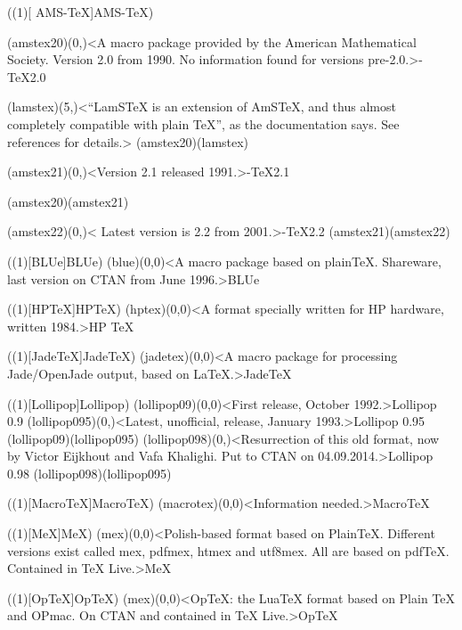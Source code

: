 \clearpage
\tograph(\tostruct(1)[\texorpdfstring{
AMS}{AMS}-\TeX]{AMS-\TeX}){
	\tonode(amstex20)(0,\layer)<A macro package provided by the American Mathematical Society. Version 2.0 from 1990. No information found for versions pre-2.0.>{\AMS-\TeX  2.0}
	\steplayer[-1]

	\tonode(lamstex)(5,\layer)<“LamSTeX{} is an extension of AmSTeX, and thus almost completely compatible with plain TeX”, as the documentation says. See references for details.>{}
	\todraw(amstex20)(lamstex)
	\steplayer[-1]

	\tonode(amstex21)(0,\layer)<Version 2.1 released 1991.>{\AMS-\TeX  2.1}

	\todraw(amstex20)(amstex21)
	\steplayer[-2]

	\tonode(amstex22)(0,\layer)< Latest version is 2.2 from 2001.>{\AMS-\TeX 2.2}
	\todraw(amstex21)(amstex22)
}

\tograph(\tostruct(1)[BLUe]{BLUe}){
	\tonode(blue)(0,0)<A macro package based on plainTeX. Shareware, last version on CTAN from June 1996.>{BLUe}
}

\tograph(\tostruct(1)[HP\TeX]{HP\TeX}){
	\tonode(hptex)(0,0)<A format specially written for HP hardware, written 1984.>{HP \TeX}
}

\tograph(\tostruct(1)[Jade\TeX]{Jade\TeX}){
	\tonode(jadetex)(0,0)<A macro package for processing Jade/OpenJade output, based on LaTeX.>{Jade\TeX}
}

\tograph(\tostruct(1)[Lollipop]{Lollipop}){
	\tonode(lollipop09)(0,0)<First release, October 1992.>{Lollipop 0.9}
	\steplayer[-2]
	\tonode(lollipop095)(0,\layer)<Latest, unofficial, release, January 1993.>{Lollipop 0.95}
	\todraw(lollipop09)(lollipop095)
	\steplayer[-2]
	\tonode(lollipop098)(0,\layer)<Resurrection of this old format, now by Victor Eijkhout and Vafa Khalighi. Put to CTAN on 04.09.2014.>{Lollipop 0.98}
	\todraw(lollipop098)(lollipop095)
}

\tograph(\tostruct(1)[Macro\TeX]{Macro\TeX}){
	\tonode(macrotex)(0,0)<Information needed.>{Macro\TeX}
}

\tograph(\tostruct(1)[MeX]{MeX}){
	\tonode(mex)(0,0)<Polish-based format based on PlainTeX. Different versions exist called mex, pdfmex, htmex and utf8mex. All are based on pdfTeX. Contained in TeX Live.>{MeX}
}

\tograph(\tostruct(1)[OpTeX]{OpTeX}){
	\tonode(mex)(0,0)<OpTeX: the LuaTeX format based on Plain TeX and OPmac. On CTAN and contained in TeX Live.>{OpTeX}
}


